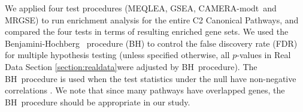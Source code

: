 \documentclass[a4,center,fleqn]{NAR}
\newcommand{\OurMethod}{MEQLEA}
\newcommand{\CMT}{CAMERA-modt}
\newcommand{\genr}{MRGSE}
\newcommand{\FDR}{Benjamini-Hochberg}
\newcommand{\FDRabb}{BH}
\begin{document}
	
	We applied four test procedures (\OurMethod, GSEA, \CMT~and \genr) to run enrichment analysis for
	the entire C2 Canonical Pathways, and compared the four tests in terms of resulting
	enriched gene sets. %
	We used the \FDR~\citep{benjamini1995controlling} procedure (\FDRabb) to control the false
	discovery rate (FDR) for multiple hypothesis testing (unless specified otherwise, all $p$-values in
	Real Data Section \ref{section:realdata}were adjusted by \FDRabb~procedure). The \FDRabb~procedure is used
	when the test statistics under the null have non-negative correlations \citep{benjamini2001control}.
	We note that since many pathways have overlapped genes, the \FDRabb~procedure should be appropriate
	in our study.
	
\end{document}
